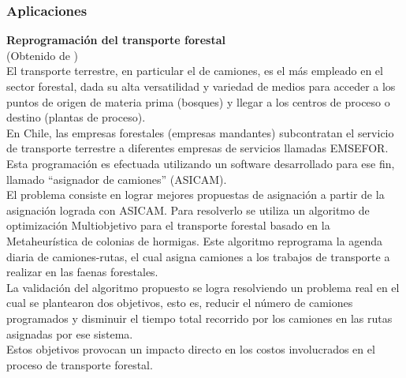 \subsubsection {Aplicaciones}
\textbf{Reprogramación del transporte forestal}\\
(Obtenido de \cite{[ARANEDA]})\\
El transporte terrestre, en particular el de camiones, es el más empleado en el sector forestal, dada su alta versatilidad y variedad de medios para acceder a los puntos de origen de materia prima (bosques) y llegar a los centros de proceso o destino (plantas de proceso).\\
En Chile, las empresas forestales (empresas mandantes) subcontratan el servicio de transporte terrestre a diferentes empresas de servicios llamadas EMSEFOR. Esta programación es efectuada utilizando un software desarrollado para ese fin, llamado “asignador de camiones” (ASICAM).\\
El problema consiste en lograr mejores propuestas de asignación a partir de la asignación lograda con ASICAM. 
Para resolverlo se utiliza un algoritmo de optimización Multiobjetivo para el transporte forestal basado en la Metaheurística de colonias de hormigas. Este algoritmo reprograma la agenda diaria de camiones-rutas, el cual asigna camiones a los trabajos de transporte a realizar en las faenas forestales.\\
La validación del algoritmo propuesto se logra resolviendo un problema real en el cual se plantearon dos objetivos, esto es, reducir el número de camiones programados y disminuir el tiempo total recorrido por
los camiones en las rutas asignadas por ese sistema.\\
Estos objetivos provocan un impacto directo en los costos involucrados en el proceso de transporte forestal.

